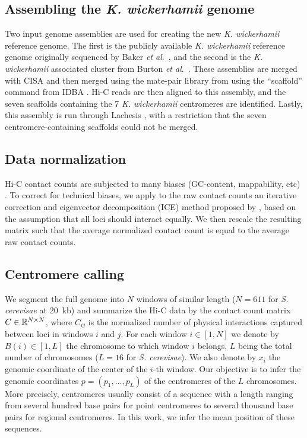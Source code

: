 \subsection{Assembling the \textit{K. wickerhamii} genome}

Two input genome assemblies are used for creating the new \textit{K.
wickerhamii}
reference genome. The first is the publicly available \textit{K. wickerhamii} reference
genome originally sequenced by Baker \textit{et al}.~\cite{baker:extensive},
and the
second is the \textit{K. wickerhamii} associated cluster from
Burton \textit{et al}.~\cite{burton:species-level}. These assemblies are merged with CISA
\citep{lin:cisa} and then
merged using the mate-pair library from \citep{burton:species-level} using the
``scaffold'' command from IDBA \citep{peng:IDBA}. Hi-C reads are then aligned to
this assembly, and the seven scaffolds containing the 7 \textit{K. wickerhamii}
centromeres are identified. Lastly, this assembly is run through Lachesis
\citep{burton:chromosome}, with a restriction that the seven
centromere-containing scaffolds could not be merged.

\subsection{Data normalization}

Hi-C contact counts are subjected to many biases (GC-content, mappability,
etc) \citep{yaffe:probabilistic}. To correct for technical biases, we apply 
to the raw contact counts an iterative correction and eigenvector decomposition
(ICE) method proposed by \citet{imakaev:iterative},
based on the assumption
that all loci should interact equally. We then rescale the resulting matrix
such that the average normalized contact count is equal to the average raw
contact counts.

\subsection{Centromere calling}

We segment the full genome into $N$ windows of similar length ($N=611$ for
\textit{S. cerevisae} at 20~kb) and summarize the Hi-C data by the contact
count matrix $C\in\mathbb{R}^{N \times N}$, where $C_{ij}$ is the normalized number
of physical interactions captured between loci in windows $i$ and $j$. 
For each window $i\in[1,N]$
we denote by $B(i) \in [1,L]$ the chromosome to which window $i$ belongs,
$L$ being the total number of chromosomes ($L=16$
for \textit{S. cerevisae}). We also denote by $x_i$ the genomic coordinate of
the center of the $i$-th window. Our objective is to infer the genomic
coordinates $p=(p_1, \ldots, p_L)$ of the centromeres of the $L$ chromosomes.
More precisely, centromeres usually consist of a sequence with a length ranging from several hundred
base pairs
for point centromeres to several thousand base pairs for regional centromeres.
In this work, we infer the mean position of these sequences.


